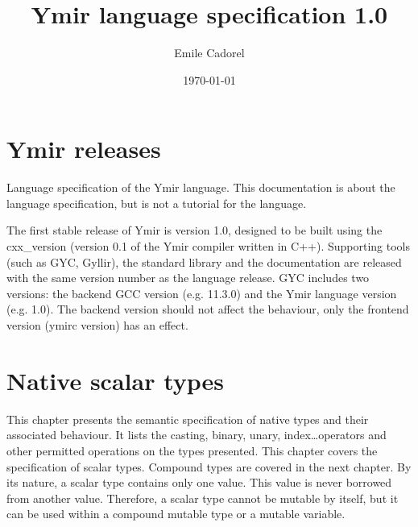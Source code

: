 \documentclass[a4paper,11pt]{book}
\author{Emile Cadorel}
\date{\today}
\title{Ymir language specification 1.0}
\begin{document}
\setlength{\aweboxleftmargin}{0.05\linewidth}
\setlength{\aweboxcontentwidth}{0.93\linewidth}


\maketitle
\dominitoc
\dominilof
\dominilot

\chapter*{Ymir releases}

Language specification of the Ymir language. This documentation is about the language specification, but is not a tutorial for the language.


The first stable release of Ymir is version 1.0, designed to be built using the cxx\_version (version 0.1 of the Ymir compiler written in C++). Supporting tools (such as GYC, Gyllir), the standard library and the documentation are released with the same version number as the language release. GYC includes two versions: the backend GCC version (e.g. 11.3.0) and the Ymir language version (e.g. 1.0). The backend version should not affect the behaviour, only the frontend version (ymirc version) has an effect.

\begin{multicols*}{2}
  \tableofcontents
\end{multicols*}


\chapter{Native scalar types}

This chapter presents the semantic specification of native types and their
associated behaviour. It lists the casting, binary, unary, index\ldots operators
and other permitted operations on the types presented. This chapter covers the
specification of scalar types. Compound types are covered in the next chapter.
By its nature, a scalar type contains only one value. This value is never
borrowed from another value. Therefore, a scalar type cannot be mutable by
itself, but it can be used within a compound mutable type or a mutable variable.

\begin{multicols*}{2}
  \minitoc%
  
\end{multicols*}
\end{document}
